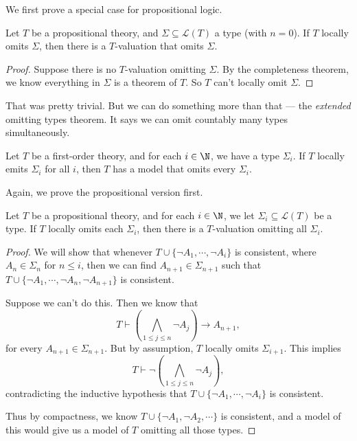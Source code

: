 \documentclass[a4paper]{article}
\begin{document}
We first prove a special case for propositional logic.
\begin{thm}
  Let $T$ be a propositional theory, and $\Sigma \subseteq \mathcal{L}(T)$ a type (with $n = 0$). If $T$ locally omits $\Sigma$, then there is a $T$-valuation that omits $\Sigma$.
\end{thm}

\begin{proof}
  Suppose there is no $T$-valuation omitting $\Sigma$. By the completeness theorem, we know everything in $\Sigma$ is a theorem of $T$. So $T$ can't locally omit $\Sigma$.
\end{proof}
That was pretty trivial. But we can do something more than that --- the \emph{extended} omitting types theorem. It says we can omit countably many types simultaneously.

\begin{thm}
  Let $T$ be a first-order theory, and for each $i \in \N$, we have a type $\Sigma_i$. If $T$ locally emits $\Sigma_i$ for all $i$, then $T$ has a model that omits every $\Sigma_i$.
\end{thm}

Again, we prove the propositional version first.
\begin{thm}
  Let $T$ be a propositional theory, and for each $i \in \N$, we let $\Sigma_i \subseteq \mathcal{L}(T)$ be a type. If $T$ locally omits each $\Sigma_i$, then there is a $T$-valuation omitting all $\Sigma_i$.
\end{thm}

\begin{proof}
  We will show that whenever $T \cup \{\neg A_1, \cdots, \neg A_i\}$ is consistent, where $A_n \in \Sigma_n$ for $n \leq i$, then we can find $A_{n + 1} \in \Sigma_{n + 1}$ such that $T \cup \{\neg A_1, \cdots, \neg A_n, \neg A_{n + 1}\}$ is consistent.

  Suppose we can't do this. Then we know that
  \[
    T \vdash \left(\bigwedge_{1 \leq j \leq n} \neg A_j \right) \to A_{n + 1},
  \]
  for every $A_{n + 1} \in \Sigma_{n + 1}$. But by assumption, $T$ locally omits $\Sigma_{i + 1}$. This implies
  \[
    T \vdash \neg \left(\bigwedge_{1 \leq j \leq n} \neg A_j \right),
  \]
  contradicting the inductive hypothesis that $T \cup \{\neg A_1, \cdots, \neg A_i\}$ is consistent.

  Thus by compactness, we know $T \cup \{\neg A_1, \neg A_2, \cdots\}$ is consistent, and a model of this would give us a model of $T$ omitting all those types.
\end{proof}
\end{document}
